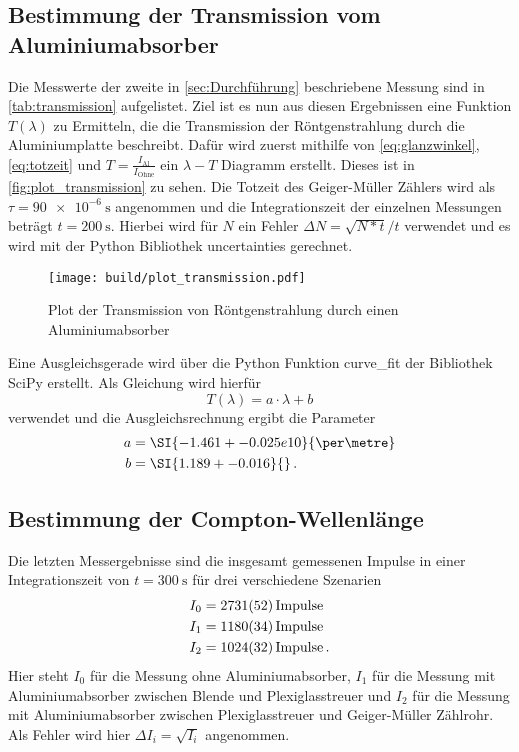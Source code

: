 \subsection{Bestimmung der Transmission vom Aluminiumabsorber}
\label{ssec:transmission}

Die Messwerte der zweite in \autoref{sec:Durchführung} beschriebene Messung sind in \autoref{tab:transmission} aufgelistet.
Ziel ist es nun aus diesen Ergebnissen eine Funktion $T(\lambda)$ zu Ermitteln, die die Transmission der Röntgenstrahlung durch die Aluminiumplatte beschreibt.
Dafür wird zuerst mithilfe von \autoref{eq:glanzwinkel}, \autoref{eq:totzeit} und $T=\frac{I_\text{Al}}{I_\text{Ohne}}$ ein $\lambda-T$ Diagramm erstellt.
Dieses ist in \autoref{fig:plot_transmission} zu sehen.
Die Totzeit des Geiger-Müller Zählers wird als $\tau = \SI{90e-6}{\second}$ angenommen und die Integrationszeit der einzelnen Messungen beträgt $t=\SI{200}{\second}$.
Hierbei wird für $N$ ein Fehler $\Delta N = \sqrt{N*t}/t$ verwendet und es wird mit der Python Bibliothek uncertainties gerechnet.\cite{uncertainties}

\begin{figure}
    \centering
    \texttt{[image: build/plot\_transmission.pdf]}
    \caption{Plot der Transmission von Röntgenstrahlung durch einen Aluminiumabsorber}
    \label{fig:plot_transmission}
\end{figure}

Eine Ausgleichsgerade wird über die Python Funktion curve\_fit der Bibliothek SciPy erstellt. \cite{scipy}
Als Gleichung wird hierfür
\begin{equation}
    T(\lambda) = a \cdot \lambda + b
\end{equation}
verwendet und die Ausgleichsrechnung ergibt die Parameter
\begin{align*}
    a &= \SI{-1.461+-0.025e10}{\per\metre} \\
    b &= \SI{1.189+-0.016}{} \,.
\end{align*}

\subsection{Bestimmung der Compton-Wellenlänge}
\label{ssec:compton-wellenlänge}

Die letzten Messergebnisse sind die insgesamt gemessenen Impulse in einer Integrationszeit von $t=\SI{300}{\second}$ für drei verschiedene Szenarien
\begin{align*}
    I_0 &= \SI{2731+-52}{Impulse} \\
    I_1 &= \SI{1180+-34}{Impulse} \\
    I_2 &= \SI{1024+-32}{Impulse} \,.
\end{align*}
Hier steht $I_0$ für die Messung ohne Aluminiumabsorber, $I_1$ für die Messung mit Aluminiumabsorber zwischen Blende und Plexiglasstreuer und $I_2$ für die Messung mit Aluminiumabsorber zwischen Plexiglasstreuer und Geiger-Müller Zählrohr.
Als Fehler wird hier $\Delta I_i=\sqrt{I_i}$ angenommen.


